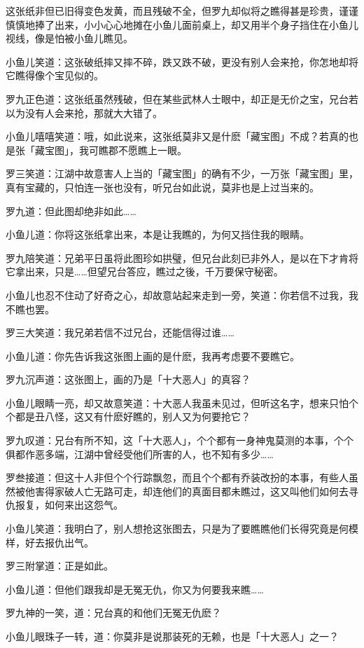\documentclass[12pt,oneside]{book}
\begin{document}
这张纸非但已旧得变色发黄，而且残破不全，但罗九却似将之瞧得甚是珍贵，谨谨慎慎地捧了出来，小小心心地摊在小鱼儿面前桌上，却又用半个身子挡住在小鱼儿视线，像是怕被小鱼儿瞧见。

小鱼儿笑道：这张破纸摔又摔不碎，跌又跌不破，更没有别人会来抢，你怎地却将它瞧得像个宝见似的。

罗九正色道：这张纸虽然残破，但在某些武林人士眼中，却正是无价之宝，兄台若以为没有人会来抢，那就大大错了。

小鱼儿嘻嘻笑道：哦，如此说来，这张纸莫非又是什麽「藏宝图」不成？若真的也是张「藏宝图」，我可瞧郡不愿瞧上一眼。

罗三笑道：江湖中故意害人上当的「藏宝图」的确有不少，一万张「藏宝图」里，真有宝藏的，只怕连一张也没有，听兄台如此说，莫非也是上过当来的。

罗九道：但此图却绝非如此\ldots\ldots{}

小鱼儿道：你将这张纸拿出来，本是让我瞧的，为何又挡住我的眼睛。

罗九陪笑道：兄弟平日虽将此图珍如拱璧，但兄台此刻已非外人，是以在下才肯将它拿出来，只是\ldots\ldots 但望兄台答应，瞧过之後，千万要保守秘密。

小鱼儿也忍不住动了好奇之心，却故意站起来走到一旁，笑道：你若信不过我，我不瞧也罢。

罗三大笑道：我兄弟若信不过兄台，还能信得过谁\ldots\ldots{}

小鱼儿道：你先告诉我这张图上画的是什麽，我再考虑要不要瞧它。

罗九沉声道：这张图上，画的乃是「十大恶人」的真容？

小鱼儿眼睛一亮，却又故意笑道：十大恶人我虽未见过，但听这名字，想来只怕个个都是丑八怪，这又有什麽好瞧的，别人又为何要抢它？

罗九叹道：兄台有所不知，这「十大恶人」，个个都有一身神鬼莫测的本事，个个俱都作恶多端，江湖中曾经受他们所害的人，也不知有多少\ldots\ldots{}

罗叁接道：但这十人非但个个行踪飘忽，而且个个都有乔装改扮的本事，有些人虽然被他害得家破人亡无路可走，却连他们的真面目都未瞧过，这又叫他们如何去寻仇报复，如何来出这怨气。

小鱼儿笑道：我明白了，别人想抢这张图去，只是为了要瞧瞧他们长得究竟是何模样，好去报仇出气。

罗三附掌道：正是如此。

小鱼儿道：但他们跟我却是无冤无仇，你又为何要我来瞧\ldots\ldots{}

罗九神的一笑，道：兄台真的和他们无冤无仇麽？

小鱼儿眼珠子一转，道：你莫非是说那装死的无赖，也是「十大恶人」之一？
\end{document}
